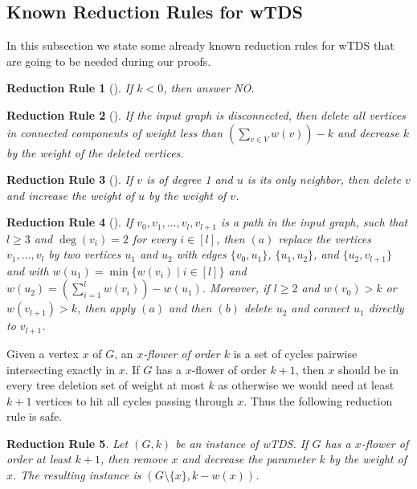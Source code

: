 \documentclass[a4paper,11pt]{article}
\newtheorem{rrule}{Reduction Rule}
\begin{document}
\subsection{Known Reduction Rules for {\sc wTDS}}

In this subsection we state some already known reduction rules for  {\sc wTDS} that are going to be needed during our proofs.

\begin{rrule}[\cite{RamanSS13}]\label{rrule1}
If $k<0$, then answer NO.
\end{rrule}

\begin{rrule}[\cite{RamanSS13}]
If the input graph is disconnected, then delete all vertices in connected components of weight less than $(\sum_{v\in V}w(v))-k$ 
and decrease $k$ by the weight of the deleted vertices.
\end{rrule}

\begin{rrule}[\cite{RamanSS13}]\label{rrule3}
If $v$ is of degree 1 and $u$ is its only neighbor, then delete $v$ and increase the weight of $u$ by the weight of $v$.
\end{rrule}

\begin{rrule}[\cite{RamanSS13}]\label{rrule4}
If $v_{0},v_{1},\dots, v_{l},v_{l+1}$ is a path in the input graph, such that $l\geq 3$ and $\deg(v_{i})=2$ for every $i\in [l]$, then 
$(a)$ replace the vertices $v_{1},\dots,v_{l}$ by two vertices $u_{1}$ and $u_{2}$ with edges $\{v_{0},u_{1}\}$, $\{u_{1},u_{2}\}$, 
and $\{u_{2},v_{l+1}\}$ and with $w(u_{1})=\min\{w(v_{i})\mid i\in [l]\}$ and $w(u_{2})=\left(\sum_{i=1}^{l}w(v_{i})\right)-w(u_{1})$.
Moreover, if $l\geq 2$ and $w(v_{0})>k$ or $w(v_{l+1})>k$, then apply $(a)$ and then $(b)$ delete $u_{2}$ and connect 
$u_{1}$ directly to $v_{l+1}$.
\end{rrule}

Given a vertex $x$ of $G$, an {\em $x$-flower of order $k$} is a set of cycles pairwise intersecting exactly in $x$.
If $G$ has a $x$-flower of order $k+1$, then $x$ should be in every tree deletion set of weight at most $k$ as otherwise we would need at least $k+1$
vertices to hit all cycles passing through $x$.
Thus the following reduction rule is safe.

\begin{rrule}\label{rrule5}
Let $(G,k)$ be an instance of {\sc wTDS}. If $G$ has a $x$-flower of order at least $k+1$, then remove $x$ and decrease the parameter $k$ by the weight of $x$. 
The resulting instance is $(G\setminus \{x\},k-w(x))$.
\end{rrule}
\end{document}
